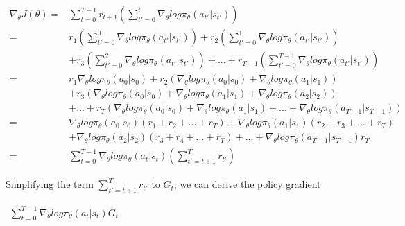 \documentclass[letterpaper,11pt]{article}
\begin{document}
$\begin{aligned}
    \nabla_{\theta} J(\theta) ={}& \sum_{t=0}^{T-1} r_{t+1} (\sum_{t'=0}^{t} \nabla_{\theta} log \pi_{\theta}(a_{t'} | s_{t'})) \\
                              ={}&  r_{1} (\sum_{t'=0}^{0} \nabla_{\theta} log \pi_{\theta}(a_{t'} | s_{t'})) + r_{2} (\sum_{t'=0}^{1} \nabla_{\theta} log \pi_{\theta}(a_{t'} | s_{t'})) \\
                                 & + r_{3} (\sum_{t'=0}^{2} \nabla_{\theta} log \pi_{\theta}(a_{t'} | s_{t'})) + ... + r_{T-1} (\sum_{t'=0}^{T-1} \nabla_{\theta} log \pi_{\theta}(a_{t'} | s_{t'})) \\
                              ={}& r_{1} \nabla_{\theta} log \pi_{\theta} (a_{0} | s_{0}) + r_{2} (\nabla_{\theta} log \pi_{\theta} (a_{0} | s_{0}) + \nabla_{\theta} log \pi_{\theta} (a_{1} | s_{1})) \\
                                 & + r_{3} (\nabla_{\theta} log \pi_{\theta} (a_{0} | s_{0}) + \nabla_{\theta} log \pi_{\theta} (a_{1} | s_{1}) + \nabla_{\theta} log \pi_{\theta} (a_{2} | s_{2})) \\
                                 & + ... + r_{T} (\nabla_{\theta} log \pi_{\theta} (a_{0} | s_{0}) + \nabla_{\theta} log \pi_{\theta} (a_{1} | s_{1}) + ... + \nabla_{\theta} log \pi_{\theta} (a_{T-1} | s_{T-1})) \\
                              ={}&  \nabla_{\theta} log \pi_{\theta} (a_{0} | s_{0}) (r_{1} + r_{2} + ... + r_{T}) + \nabla_{\theta} log \pi_{\theta} (a_{1} | s_{1}) (r_{2} + r_{3} + ... +  r_{T}) \\
                                 & + \nabla_{\theta} log \pi_{\theta} (a_{2} | s_{2}) (r_{3} + r_{4} + ... + r_{T}) + ... + \nabla_{\theta} log \pi_{\theta} (a_{T-1} | s_{T-1}) r_{T} \\
                              ={}& \sum_{t=0}^{T-1} \nabla_{\theta} log \pi_{\theta} (a_{t} | s_{t}) (\sum_{t'=t+1}^{T} r_{t'}) 
\end{aligned}$

Simplifying the term $\sum_{t'=t+1}^{T} r_{t'}$ to $G_{t}$, we can derive the policy gradient

\begin{center}
$\begin{aligned}
    \sum_{t=0}^{T-1} \nabla_{\theta} log \pi_{\theta} (a_{t} | s_{t}) G_{t}
\end{aligned}$
\end{center}
\vspace{0.3cm}
\end{document}
